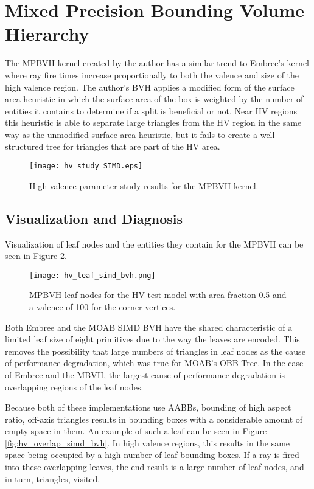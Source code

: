 \section{Mixed Precision Bounding Volume Hierarchy}\label{sec:simd_hv_study}

The MPBVH kernel created by the author has a similar trend to Embree's
kernel where ray fire times increase proportionally to both the valence and size
of the high valence region. The author's BVH applies a modified form of the
surface area heuristic in which the surface area of the box is weighted by the
number of entities it contains to determine if a split is beneficial or
not. Near HV regions this heuristic is able to separate large triangles from the
HV region in the same way as the unmodified surface area heuristic, but it
fails to create a well-structured tree for triangles that are part of the HV area.

\begin{figure}[H]
  \centering
    \texttt{[image: hv\_study\_SIMD.eps]}
    \caption{High valence parameter study results for the MPBVH kernel.}
    \label{fig:hv_study_simd}
\end{figure}

\subsection{Visualization and Diagnosis}

Visualization of leaf nodes and the entities they contain for the MPBVH
can be seen in Figure \ref{fig:hv_leaf_simd_bvh}.

\begin{figure}
  \centering
  \texttt{[image: hv\_leaf\_simd\_bvh.png]}
  \caption{MPBVH leaf nodes for the HV test model with area fraction
    0.5 and a valence of 100 for the corner vertices.}
  \label{fig:hv_leaf_simd_bvh}
\end{figure}
  
Both Embree and the MOAB SIMD BVH have the shared characteristic of a limited
leaf size of eight primitives due to the way the leaves are encoded. This
removes the possibility that large numbers of triangles in leaf nodes as the
cause of performance degradation, which was true for MOAB's OBB Tree. In the case
of Embree and the MBVH, the largest cause of performance degradation is
overlapping regions of the leaf nodes.

Because both of these implementations use AABBs, bounding of high aspect ratio,
off-axis triangles results in bounding boxes with a considerable amount of empty
space in them. An example of such a leaf can be seen in Figure
\ref{fig:hv_overlap_simd_bvh}. In high valence regions, this results in the same
space being occupied by a high number of leaf bounding boxes. If a ray is fired
into these overlapping leaves, the end result is a large number of leaf nodes,
and in turn, triangles, visited.

